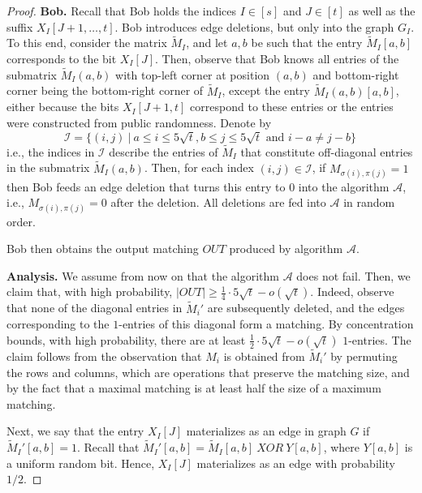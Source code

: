 \documentclass[11pt,a4paper]{article}
\begin{document}
\begin{proof}
\vspace{0.1cm}
\noindent \textbf{Bob.} Recall that Bob holds the indices $I \in [s]$ and $J \in [t]$ as well as the suffix $X_I[J+1, \dots, t]$.
Bob introduces edge deletions, but only into the graph $G_I$. To this end, consider the matrix $\tilde{M}_I$, and let $a,b$ be such that the entry $\tilde{M}_I[a,b]$ corresponds to the bit $X_I[J]$. Then, observe that Bob knows all entries of the submatrix $\tilde{M}_I(a,b)$ with top-left corner at position $(a,b)$ and bottom-right corner being the bottom-right corner of $\tilde{M}_I$, except the entry $\tilde{M}_I(a,b)[a,b]$, either because the bits $X_I[J+1, t]$ correspond to these entries or the entries were constructed from public randomness. Denote by 
$$\mathcal{I} = \{(i,j) \ | \ a \le i \le 5 \sqrt{t}, b \le j \le 5 \sqrt{t} \mbox{ and } i - a \neq j - b\} \, $$ 
i.e., the indices in $\mathcal{I}$ describe the entries of $\tilde{M}_I$ that constitute off-diagonal entries in the submatrix $\tilde{M}_I(a,b)$. Then, for each index $(i,j) \in \mathcal{I}$, if $M_{\sigma(i), \pi(j)} = 1$ then Bob feeds an edge deletion that turns this entry to $0$ into the algorithm $\mathcal{A}$, i.e., $M_{\sigma(i), \pi(j)} = 0$ after the deletion. All deletions are fed into $\mathcal{A}$ in random order.

Bob then obtains the output matching $OUT$ produced by algorithm $\mathcal{A}$.

\vspace{0.1cm}
\noindent \textbf{Analysis.} 
 We assume from now on that the algorithm $\mathcal{A}$  does not fail. Then, we  claim that, with high probability, $|OUT| \ge \frac{1}{4} \cdot 5 \sqrt{t} - o(\sqrt{t})$. Indeed, observe that none of the diagonal entries in $\tilde{M}_i'$ are subsequently deleted, and the edges corresponding to the $1$-entries of this diagonal form a matching. By concentration bounds, with high probability, there are at least $\frac{1}{2} \cdot 5 \sqrt{t} - o(\sqrt{t})$ $1$-entries. The claim follows from the observation that $M_i$ is obtained from $\tilde{M}_i'$ by permuting the rows and columns, which are operations that preserve the matching size, and by the fact that a maximal matching is at least half the size of a maximum matching.

Next, we say that the entry $X_I[J]$ materializes as an edge in graph $G$ if $\tilde{M}_I'[a,b] = 1$. Recall that $\tilde{M}_I'[a,b] = \tilde{M}_I[a,b] \ XOR \ Y[a,b]$, where $Y[a,b]$ is a uniform random bit. Hence, $X_I[J]$ materializes as an edge with probability $1/2$.


\end{proof}
\end{document}
